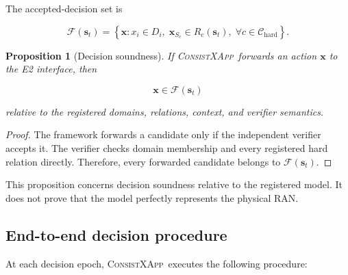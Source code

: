 \documentclass[pdflatex,sn-mathphys-num,iicol,oneside]{sn-jnl}
\newcommand{\method}{\textsc{ConsistXApp}}
\newtheorem{proposition}{Proposition}
\begin{document}
The accepted-decision set is

\begin{equation}
\mathcal{F}(\bm{s}_t)
=
\left\{
\bm{x}:
x_i\in D_i,
\;
\bm{x}_{S_c}\in R_c(\bm{s}_t),
\;
\forall c\in\mathcal{C}_{\mathrm{hard}}
\right\}.
\label{eq:feasible-set}
\end{equation}

\begin{proposition}[Decision soundness]
If \method\ forwards an action $\bm{x}$ to the E2 interface, then

\begin{equation}
\bm{x}\in\mathcal{F}(\bm{s}_t)
\end{equation}

relative to the registered domains, relations, context, and verifier
semantics.
\end{proposition}

\begin{proof}
The framework forwards a candidate only if the independent verifier
accepts it. The verifier checks domain membership and every
registered hard relation directly. Therefore, every forwarded
candidate belongs to $\mathcal{F}(\bm{s}_t)$.
\end{proof}

This proposition concerns decision soundness relative to the
registered model. It does not prove that the model perfectly
represents the physical RAN.

\subsection{End-to-end decision procedure}

At each decision epoch, \method\ executes the following procedure:
\end{document}
